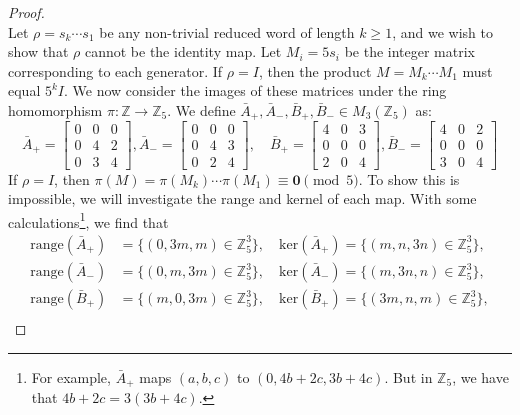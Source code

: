 \begin{proof}
\begin{equation}
    \end{equation}
    Let $\rho = s_k \cdots s_1$ be any non-trivial reduced word of length $k \geq 1$, and we wish to show that $\rho$ cannot be the identity map. Let $M_i = 5s_i$ be the integer matrix corresponding to each generator. If $\rho = I$, then the product $M = M_k \cdots M_1$ must equal $5^k I$. We now consider the images of these matrices under the ring homomorphism $\pi: \mathbb{Z} \to \mathbb{Z}_5$. We define $\bar{A}_{+}, \bar{A}_{-}, \bar{B}_{+}, \bar{B}_{-} \in M_3(\mathbb{Z}_5)$ as:
    \begin{equation}
      \bar{A}_{+} = \begin{bmatrix} 0 & 0 & 0 \\ 0 & 4 & 2 \\ 0 & 3 & 4 \end{bmatrix}, \bar{A}_{-} = \begin{bmatrix} 0 & 0 & 0 \\ 0 & 4 & 3 \\ 0 & 2 & 4 \end{bmatrix}, \quad \bar{B}_{+} = \begin{bmatrix} 4 & 0 & 3 \\ 0 & 0 & 0 \\ 2 & 0 & 4 \end{bmatrix}, \bar{B}_{-} = \begin{bmatrix} 4 & 0 & 2 \\ 0 & 0 & 0 \\ 3 & 0 & 4 \end{bmatrix}
    \end{equation}
    If $\rho = I$, then $\pi(M) = \pi(M_k) \cdots \pi(M_1) \equiv \mathbf{0} \pmod 5$. To show this is impossible, we will investigate the range and kernel of each map. With some calculations\footnote{For example, $\bar{A}_{+}$ maps $(a, b, c)$ to $(0, 4b + 2c, 3b + 4c)$. But in $\mathbb{Z}_5$, we have that $4b + 2c = 3 (3b + 4c)$.}, we find that 
    \begin{align}
      \mathrm{range}(\bar{A}_{+}) &= \{ (0, 3m, m) \in \mathbb{Z}_5^3 \}, \quad \mathrm{ker}(\bar{A}_{+}) = \{ (m, n, 3n) \in \mathbb{Z}_5^3 \}, \\
      \mathrm{range}(\bar{A}_{-}) &= \{ (0, m, 3m) \in \mathbb{Z}_5^3 \}, \quad \mathrm{ker}(\bar{A}_{-}) = \{ (m, 3n, n) \in \mathbb{Z}_5^3 \}, \\
      \mathrm{range}(\bar{B}_{+}) &= \{ (m, 0, 3m) \in \mathbb{Z}_5^3 \}, \quad \mathrm{ker}(\bar{B}_{+}) = \{ (3m, n, m) \in \mathbb{Z}_5^3 \}, \\

\end{align}
\end{proof}

